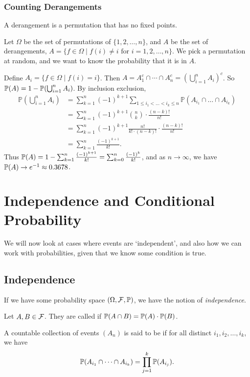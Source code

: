 \documentclass[a4paper]{scrreprt}
\begin{document}
\subsection*{Counting Derangements}

A derangement is a permutation that has no fixed points.

Let $\Omega$ be the set of permutations of $\{1, 2, \dots, n\}$, and $A$ be the set of derangements, $A = \{f \in \Omega \mid f(i) \neq i \text{ for } i = 1,2, \dots, n\}$.
We pick a permutation at random, and we want to know the probability that it is in $A$.

Define $A_i = \{ f \in \Omega \mid f(i) = i\}$. Then $A = A_1^c \cap \cdots \cap A_n^c = \left(\bigcup_{i = 1}^{n} A_i\right)^c$. So $\mathbb{P}(A) = 1 - \mathbb{P}(\bigcup_{i = 1}^n A_i)$. By inclusion exclusion,
\begin{align*}
\mathbb{P}\left(\bigcup_{i=1}^{n} A_{i}\right)&=\sum_{k=1}^{n}(-1)^{k+1} \sum_{1 \leq i_{1}<\ldots<i_{k} \leq n} \mathbb{P}\left(A_{i_1} \cap \ldots \cap A_{i_{k}}\right)\\
&= \sum_{k = 1}^n (-1)^{k + 1} \binom{n}{k} \cdot \frac{(n - k)!}{n!} \\
&= \sum_{k = 1}^n (-1)^{k + 1} \frac{n!}{k! \cdot (n - k)!}
 \cdot \frac{(n - k)!}{n!} \\
 &= \sum_{k = 1}^n \frac{(-1)^{k + 1}}{k!}.
 \end{align*}
Thus $\mathbb{P}(A) = 1 - \sum_{k = 1}^n \frac{(-1)^{k + 1}}{k!} = \sum_{k = 0}^{n} \frac{(-1)^k}{k!}$, and as $n \rightarrow \infty$, we have $\mathbb{P}(A) \rightarrow e^{-1} \approx 0.3678$.

\chapter{Independence and Conditional Probability}

We will now look at cases where events are `independent', and also how we can work with probabilities, given that we know some condition is true.

\section{Independence}

If we have some probability space $(\Omega, \mathcal{F}, \mathbb{P})$, we have the notion of \emph{independence}.

\begin{definition}[Independence]
Let $A, B \in \mathcal{F}$. They are called  if $\mathbb{P}(A \cap B) = \mathbb{P}(A) \cdot \mathbb{P}(B)$.

A countable collection of events $(A_n)$ is said to be  if for all distinct $i_1, i_2, \dots, i_k$, we have
$$
\mathbb{P}(A_{i_1} \cap \cdots \cap A_{i_k}) = \prod_{j = 1}^k \mathbb{P}(A_{i_j}).
$$
\end{definition}
\end{document}
